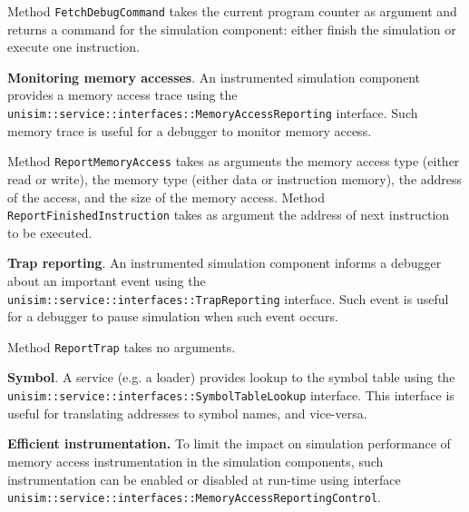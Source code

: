 \begin{center}
	
\end{center}

Method \texttt{FetchDebugCommand} takes the current program counter as argument and returns a command for the simulation component: either finish the simulation or execute one instruction.

\textbf{Monitoring memory accesses}. An instrumented simulation component provides a memory access trace using the \texttt{unisim::service::interfaces::MemoryAccessReporting} interface.
Such memory trace is useful for a debugger to monitor memory access.

\begin{center}
	
\end{center}

Method \texttt{ReportMemoryAccess} takes as arguments the memory access type (either read or write), the memory type (either data or instruction memory), the address of the access, and the size of the memory access.
Method \texttt{ReportFinishedInstruction} takes as argument the address of next instruction to be executed.

\textbf{Trap reporting}. An instrumented simulation component informs a debugger about an important event using the \texttt{unisim::service::interfaces::TrapReporting} interface.
Such event is useful for a debugger to pause simulation when such event occurs.

\begin{center}
	
\end{center}

Method \texttt{ReportTrap} takes no arguments.

\textbf{Symbol}. A service (e.g. a loader) provides lookup to the symbol table using the \texttt{unisim::service::interfaces::SymbolTableLookup} interface.
This interface is useful for translating addresses to symbol names, and vice-versa.

\begin{center}
	
\end{center}

\textbf{Efficient instrumentation.} To limit the impact on simulation performance of memory access instrumentation in the simulation components, such instrumentation can be enabled or disabled at run-time using interface \texttt{unisim::service::interfaces::MemoryAccessReportingControl}.

